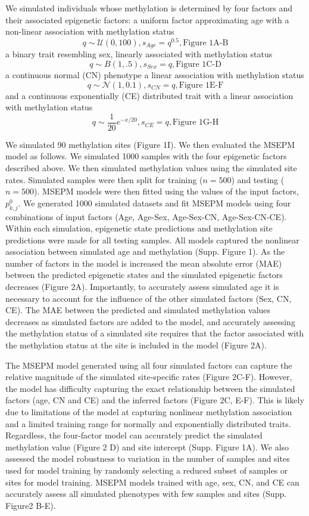 \documentclass{article}
\begin{document}
{\begin{linenumbers}
We simulated individuals whose methylation is determined by four factors and their associated epigenetic factors: 
a uniform factor approximating age with a non-linear association with methylation status 
$$q \sim\mathcal{U}(0,100), s_{Age}=q^{0.5}, \text{Figure 1A-B}$$ a binary trait resembling sex, linearly associated 
with methylation status $$q \sim B(1,.5), s_{Sex}=q, \text{Figure 1C-D}$$ a continuous normal (CN) phenotype a linear 
association with methylation status $$q \sim\mathcal{N}(1, 0.1), s_{CN}=q, 
\text{Figure 1E-F}$$ and a 
continuous exponentially (CE) distributed trait with a linear association with methylation status 
$$q \sim \frac{1}{20}e^{-x/20}, s_{CE}=q, \text{Figure 1G-H}$$ 


We simulated 90 methylation sites (Figure 1I). We then evaluated the MSEPM model as follows. We simulated 1000 samples with the 
four epigenetic factors described above. We then simulated methylation values using the simulated site rates. Simulated samples
 were then split for training ($n=500$) and testing ($n=500$). MSEPM models were then fitted using the values of the input factors, $p^0_{k,j}$. 
 We generated 1000 simulated datasets and fit MSEPM models using four combinations of input factors (Age, Age-Sex, Age-Sex-CN, Age-Sex-CN-CE). 
 Within each simulation, epigenetic state predictions and methylation site predictions were made for all testing samples. All models captured 
 the nonlinear association between simulated age and methylation (Supp. Figure 1). As the number of factors in the model is increased the mean 
 absolute error (MAE) between the predicted epigenetic states and the simulated epigenetic factors decreases (Figure 2A). Importantly, to accurately
  assess simulated age it is necessary to account for the influence of the other simulated factors (Sex, CN, CE). The MAE between the predicted 
  and simulated methylation values decreases as simulated factors are added to the model, and accurately assessing the methylation status of a 
  simulated site requires that the factor associated with the methylation status at the site is included in the model (Figure 2A). 

The MSEPM model generated using all four simulated factors can capture the relative magnitude of the simulated site-specific rates (Figure 2C-F).  
However, the model has difficulty capturing the exact relationship between the simulated factors (age, CN and CE) and the inferred 
factors (Figure 2C, E-F). This is likely due to limitations of the model at capturing nonlinear methylation association and a 
limited training range for normally and exponentially distributed traits. Regardless, the four-factor model can accurately 
predict the simulated methylation value (Figure 2 D) and site intercept (Supp. Figure 1A). We also assessed the model 
robustness to variation in the number of samples and sites used for model training by randomly selecting a reduced 
subset of samples or sites for model training. MSEPM models trained with age, sex, CN, and CE can accurately assess 
all simulated phenotypes with few samples and sites (Supp. Figure2 B-E). 


\end{linenumbers}}
\end{document}

